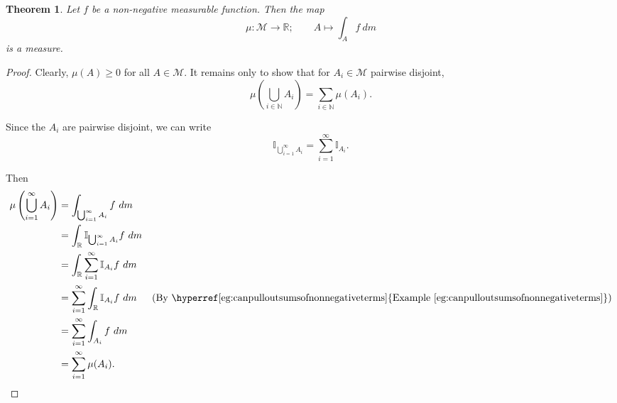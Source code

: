 \documentclass[a4paper,12pt]{scrreprt}
\newcommand{\R}{\mathbb{R}}
\newcommand{\N}{\mathbb{N}}
\theoremstyle{definition}
\theoremstyle{plain}
\newtheorem{theorem}[definition]{Theorem}
\theoremstyle{remark}
\begin{document}

\begin{theorem}
  \label{thm:integrationagainstnonnegativefunctioismeasure}
  Let $f$ be a non-negative measurable function. Then the map
  \begin{equation*}
    \mu\colon \mathcal{M} \to \R;\qquad A \mapsto \int_{A} f\ dm
  \end{equation*}
  is a measure.
\end{theorem}
\begin{proof}
  Clearly, $\mu(A) \geq 0$ for all $A \in \mathcal{M}$. It remains only to show that for $A_{i} \in \mathcal{M}$ pairwise disjoint,
  \begin{equation*}
    \mu\left( \bigcup_{i \in \N} A_{i} \right) = \sum_{i \in \N} \mu(A_{i}).
  \end{equation*}

  Since the $A_{i}$ are pairwise disjoint, we can write
  \begin{equation*}
    \mathbb{I}_{\bigcup_{i = 1}^{\infty} A_{i}} = \sum_{i = 1}^{\infty} \mathbb{I}_{A_{i}}.
  \end{equation*}

  Then
  \begin{align*}
    \mu\left( \bigcup_{i = 1}^{\infty} A_{i} \right) &=  \int_{\bigcup_{i = 1}^{\infty} A_{i}} f\ dm \\
    &= \int_{\R} \mathbb{I}_{\bigcup_{i = 1}^{\infty} A_{i}} f\ dm \\
    &= \int_{\R} \sum_{i = 1}^{\infty} \mathbb{I}_{A_{i}} f\ dm \\
    &= \sum_{i = 1}^{\infty} \int_{\R} \mathbb{I}_{A_{i}}f\ dm & (\text{By \hyperref[eg:canpulloutsumsofnonnegativeterms]{Example~\ref*{eg:canpulloutsumsofnonnegativeterms}}}) \\
    &= \sum_{i = 1}^{\infty} \int_{A_{i}} f\ dm \\
    &= \sum_{i = 1}^{\infty} \mu(A_{i}).
  \end{align*}
\end{proof}
\end{document}
